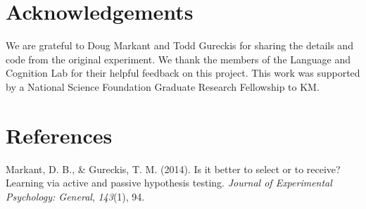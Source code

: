 \documentclass[10pt, letterpaper]{article}
\begin{document}
\section{Acknowledgements}\label{acknowledgements}

We are grateful to Doug Markant and Todd Gureckis for sharing the
details and code from the original experiment. We thank the members of
the Language and Cognition Lab for their helpful feedback on this
project. This work was supported by a National Science Foundation
Graduate Research Fellowship to KM.

\section{References}\label{references}

\setlength{\parindent}{-0.1in} \setlength{\leftskip}{0.125in} \noindent

Markant, D. B., \& Gureckis, T. M. (2014). Is it better to select or to
receive? Learning via active and passive hypothesis testing.
\emph{Journal of Experimental Psychology: General}, \emph{143}(1), 94.
\end{document}
